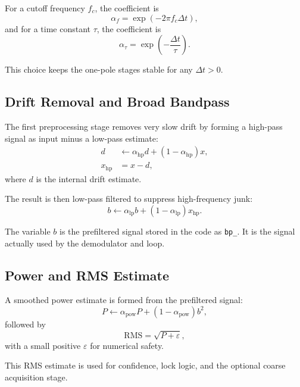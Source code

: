 \documentclass[conference]{IEEEtran}
\begin{document}
For a cutoff frequency \(f_c\), the coefficient is
\begin{equation}
  \alpha_f = \exp(-2\pi f_c \Delta t),
\end{equation}
and for a time constant \(\tau\), the coefficient is
\begin{equation}
  \alpha_\tau = \exp\!\left(-\frac{\Delta t}{\tau}\right).
\end{equation}

This choice keeps the one-pole stages stable for any \(\Delta t > 0\).

\subsection{Drift Removal and Broad Bandpass}

The first preprocessing stage removes very slow drift by forming a high-pass
signal as input minus a low-pass estimate:
\begin{align}
  d &\leftarrow \alpha_{\mathrm{hp}} d + (1-\alpha_{\mathrm{hp}})x,\\
  x_{\mathrm{hp}} &= x - d,
\end{align}
where \(d\) is the internal drift estimate.

The result is then low-pass filtered to suppress high-frequency junk:
\begin{equation}
  b \leftarrow \alpha_{\mathrm{lp}} b + (1-\alpha_{\mathrm{lp}})x_{\mathrm{hp}}.
\end{equation}

The variable \(b\) is the prefiltered signal stored in the code as
\texttt{bp\_}. It is the signal actually used by the demodulator and loop.

\subsection{Power and RMS Estimate}

A smoothed power estimate is formed from the prefiltered signal:
\begin{equation}
  P \leftarrow \alpha_{\mathrm{pow}} P + (1-\alpha_{\mathrm{pow}})b^2,
\end{equation}
followed by
\begin{equation}
  \mathrm{RMS} = \sqrt{P + \varepsilon},
\end{equation}
with a small positive \(\varepsilon\) for numerical safety.

This RMS estimate is used for confidence, lock logic, and the optional coarse
acquisition stage.
\end{document}
